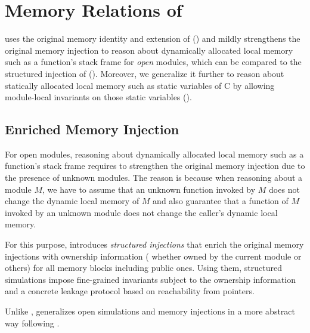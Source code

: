 {\revisioncmd
\section{Memory Relations of \ccm{}}
\label{sec:overview-verification:injection}

\ccm{} uses the original memory identity and extension of \cc{}
() and mildly
strengthens the original memory injection to reason about dynamically allocated
local memory such as a function's stack frame for \emph{open} modules,
which can be compared to the structured injection of \ccc{}
().
Moreover, we generalize it further to reason about statically allocated local memory
such as static variables of C by allowing module-local invariants on those static variables
().

\subsection{Enriched Memory Injection}
\label{sec:overview-verification:injection:dynamic}
%
For open modules, reasoning about dynamically allocated local memory
such as a function's stack frame requires to strengthen the original
memory injection due to the presence of unknown modules.  The reason
is because when reasoning about a module $M$, we have to assume that
an unknown function invoked by $M$ does not change the dynamic local
memory of $M$ and also guarantee that a function of $M$ invoked by an
unknown module does not change the caller's dynamic local memory.

For this purpose, \ccc{} introduces \emph{structured injections} that
enrich the original memory injections with ownership information (\ie
whether owned by the current module or others) for all memory blocks
including public ones.  Using them, structured simulations impose
fine-grained invariants subject to the ownership information and a
concrete leakage protocol based on reachability from pointers.

Unlike \ccc{}, \ccm{} generalizes open simulations and memory injections
in a more abstract way following \cite{DBLP:conf/icfp/DreyerNB10,pb}.

}

